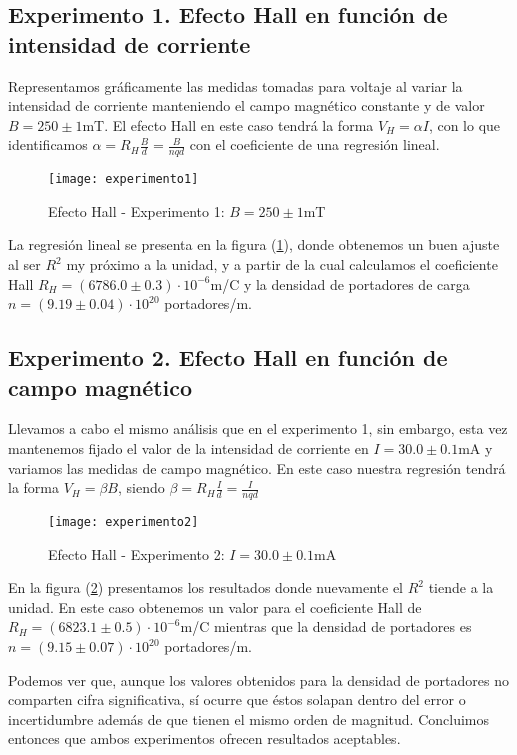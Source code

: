 \subsection{Experimento 1. Efecto Hall en función de intensidad de corriente}

Representamos gráficamente las medidas tomadas para voltaje al variar la intensidad de corriente manteniendo el campo magnético constante y de valor $B = 250 \pm 1$mT. El efecto Hall en este caso tendrá la forma $V_H = \alpha I$, con lo que identificamos $\alpha = R_H \frac{B}{d} = \frac{B}{nqd}$ con el coeficiente de una regresión lineal.

\begin{figure}[t]
    \texttt{[image: experimento1]}
    \caption{Efecto Hall - Experimento 1: $B = 250 \pm 1$mT}
    \label{figure_exp1}
\end{figure}

La regresión lineal se presenta en la figura (\ref{figure_exp1}), donde obtenemos un buen ajuste al ser $R^2$ my próximo a la unidad, y a partir de la cual calculamos el coeficiente Hall $R_H = (6786.0 \pm 0.3) \cdot 10^{-6}$m/C y la densidad de portadores de carga $n = (9.19 \pm 0.04) \cdot 10^{20}$ portadores/m.

\subsection{Experimento 2. Efecto Hall en función de campo magnético}

Llevamos a cabo el mismo análisis que en el experimento 1, sin embargo, esta vez mantenemos fijado el valor de la intensidad de corriente en $I = 30.0 \pm 0.1$mA y variamos las medidas de campo magnético. En este caso nuestra regresión tendrá la forma $V_H = \beta B$, siendo $\beta = R_H \frac{I}{d} = \frac{I}{nqd}$

\begin{figure}[t]
	\texttt{[image: experimento2]}
	\caption{Efecto Hall - Experimento 2: $I = 30.0 \pm 0.1$mA}
	\label{figure_exp2}
\end{figure}

En la figura (\ref{figure_exp2}) presentamos los resultados donde nuevamente el $R^2$ tiende a la unidad. En este caso obtenemos un valor para el coeficiente Hall de $R_H = (6823.1 \pm 0.5) \cdot 10^{-6}$m/C mientras que la densidad de portadores es $n = (9.15 \pm 0.07) \cdot 10^{20}$ portadores/m.

Podemos ver que, aunque los valores obtenidos para la densidad de portadores no comparten cifra significativa, sí ocurre que éstos solapan dentro del error o incertidumbre además de que tienen el mismo orden de magnitud. Concluimos entonces que ambos experimentos ofrecen resultados aceptables.

